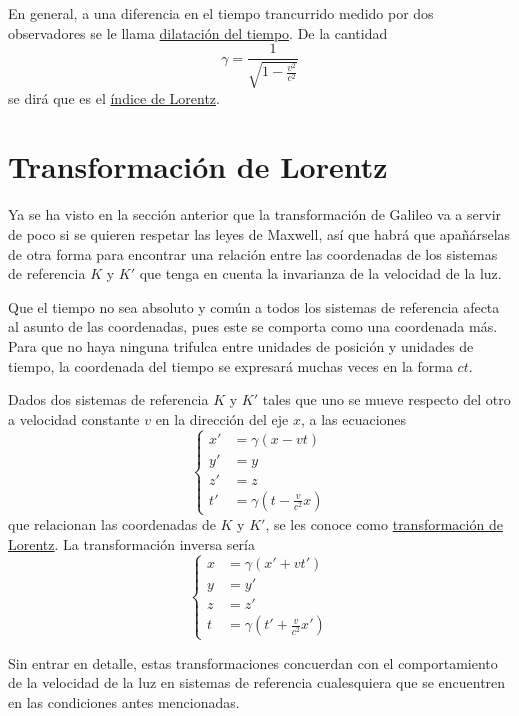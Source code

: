\documentclass[12pt]{report}
\begin{document}
En general, a una diferencia en el tiempo trancurrido medido por dos observadores se le llama \ul{dilatación del tiempo}. De la cantidad
\[\gamma = \frac{1}{\sqrt{1-\frac{v^2}{c^2}}}\]
se dirá que es el \ul{índice de Lorentz}.

\section{Transformación de Lorentz}

Ya se ha visto en la sección anterior que la transformación de Galileo va a servir de poco si se quieren respetar las leyes de Maxwell, así que habrá que apañárselas de otra forma para encontrar una relación entre las coordenadas de los sistemas de referencia $K$ y $K'$ que tenga en cuenta la invarianza de la velocidad de la luz.

\vspace{2mm}
Que el tiempo no sea absoluto y común a todos los sistemas de referencia afecta al asunto de las coordenadas, pues este se comporta como una coordenada más. Para que no haya ninguna trifulca entre unidades de posición y unidades de tiempo, la coordenada del tiempo se expresará muchas veces en la forma $ct$.

\vspace{2mm}
Dados dos sistemas de referencia $K$ y $K'$ tales que uno se mueve respecto del otro a velocidad constante $v$ en la dirección del eje $x$, a las ecuaciones
\[
\left\{
\begin{aligned}
    x' &= \gamma(x-vt) \\
    y' &= y \\
    z' &= z \\
    t' &= \gamma(t-\frac{v}{c^2}x)
\end{aligned}
\right.
\]
que relacionan las coordenadas de $K$ y $K'$, se les conoce como \ul{transformación de Lorentz}. La transformación inversa sería
\[
\left\{
\begin{aligned}
    x &= \gamma(x'+vt') \\
    y &= y' \\
    z &= z' \\
    t &= \gamma(t'+\frac{v}{c^2}x')
\end{aligned}
\right.
\]


\vspace{2mm}
Sin entrar en detalle, estas transformaciones concuerdan con el comportamiento de la velocidad de la luz en sistemas de referencia cualesquiera que se encuentren en las condiciones antes mencionadas.
\end{document}
